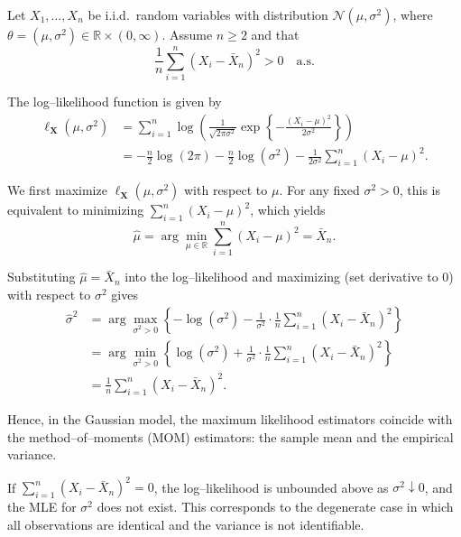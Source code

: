 \begin{ex}[Gaussian model; MLE = MOM]
Let \(X_1,\dots,X_n\) be i.i.d.\ random variables with distribution
\(\mathcal{N}(\mu,\sigma^2)\), where
\(\theta=(\mu,\sigma^2)\in\mathbb{R}\times(0,\infty)\).
Assume \(n\ge 2\) and that
\[
    \frac{1}{n}\sum_{i=1}^n (X_i-\bar X_n)^2 > 0
    \quad \text{a.s.}
\]

The log--likelihood function is given by
\begin{align*}
    \ell_{\mathbf{X}}(\mu,\sigma^2)
    &= \sum_{i=1}^n
    \log\!\left(
        \frac{1}{\sqrt{2\pi\sigma^2}}
        \exp\!\left\{
            -\frac{(X_i-\mu)^2}{2\sigma^2}
        \right\}
    \right) \\
    &= -\frac{n}{2}\log(2\pi)
       -\frac{n}{2}\log(\sigma^2)
       -\frac{1}{2\sigma^2}
         \sum_{i=1}^n (X_i-\mu)^2.
\end{align*}

We first maximize \(\ell_{\mathbf{X}}(\mu,\sigma^2)\) with respect to
\(\mu\). For any fixed \(\sigma^2>0\), this is equivalent to minimizing
\(\sum_{i=1}^n (X_i-\mu)^2\), which yields
\[
    \hat\mu
    = \arg\min_{\mu\in\mathbb{R}}
      \sum_{i=1}^n (X_i-\mu)^2
    = \bar X_n.
\]

Substituting \(\hat\mu=\bar X_n\) into the log--likelihood and maximizing (set derivative to 0)
with respect to \(\sigma^2\) gives
\begin{align*}
    \hat\sigma^2
    &= \arg\max_{\sigma^2>0}
      \left\{
        -\log(\sigma^2)
        -\frac{1}{\sigma^2}
        \cdot
        \frac{1}{n}
        \sum_{i=1}^n (X_i-\bar X_n)^2
      \right\}\\
    &= \arg \min\limits_{\sigma^2>0} \left\{ \log(\sigma^2) + \frac{1}{\sigma^2} 
    \cdot 
\frac{1}{n}
\sum\limits_{i=1}^{n} (X_{i}-\bar{X}_{n})^2  \right\}\\ 
    &= \frac{1}{n}\sum_{i=1}^n (X_i-\bar X_n)^2.
\end{align*}

Hence, in the Gaussian model, the maximum likelihood estimators coincide
with the method--of--moments (MOM) estimators: the sample mean and the
empirical variance.

If \(\sum_{i=1}^n (X_i-\bar X_n)^2 = 0\), the log--likelihood is unbounded
above as \(\sigma^2\downarrow 0\), and the MLE for \(\sigma^2\) does not
exist. This corresponds to the degenerate case in which all observations
are identical and the variance is not identifiable.
\end{ex}

